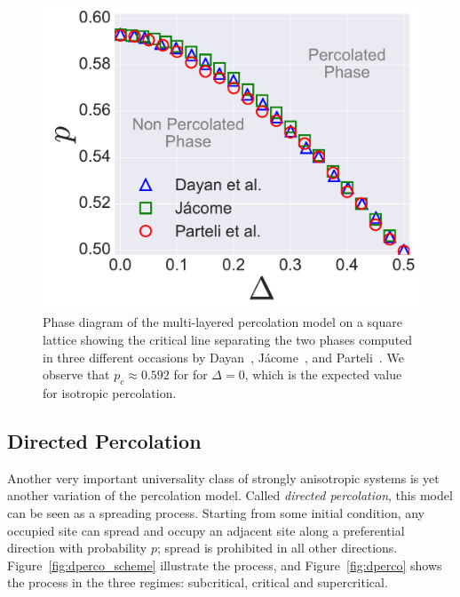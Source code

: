 \begin{figure}[t]
\begin{center}
    \includegraphics[scale=0.4]{chapters/ch5-anis/figs/mlp_ps0}
\end{center}
\caption{Phase diagram of the multi-layered percolation model on a square
    lattice showing the critical line separating the two phases computed in
    three different occasions by Dayan~\cite{Dayan1991},
    J\'acome~\cite{Samyr2009}, and Parteli~\cite{Parteli2010}. We observe that
    $p_c\approx0.592$ for for $\Delta=0$, which is the expected value for
    isotropic percolation.}
\label{fig:mlp_ps0}
\end{figure}


\subsection{Directed Percolation}
\label{sec:dp}

Another very important universality class of strongly anisotropic systems is
yet another variation of the percolation model. Called \textit{directed
percolation}, this model can be seen as a spreading process. Starting from
some initial condition, any occupied site can spread and occupy an adjacent
site along a preferential direction with probability $p$; spread is prohibited
in all other directions. Figure~\ref{fig:dperco_scheme} illustrate the process,
and Figure~\ref{fig:dperco} shows the process in the three regimes:
subcritical, critical and supercritical.

